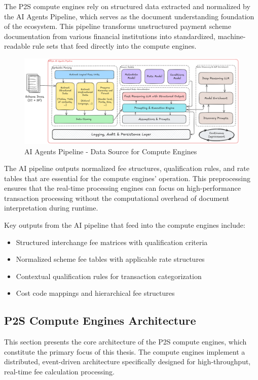 The P2S compute engines rely on structured data extracted and normalized by the AI Agents Pipeline, which serves as the document understanding foundation of the ecosystem. This pipeline transforms unstructured payment scheme documentation from various financial institutions into standardized, machine-readable rule sets that feed directly into the compute engines.

\begin{figure}[H]
    \centering
    \includegraphics[width=\textwidth]{img/arch/pipeline_design.png}
    \caption{AI Agents Pipeline - Data Source for Compute Engines}
    \label{fig:ai_pipeline_architecture}
\end{figure}

The AI pipeline outputs normalized fee structures, qualification rules, and rate tables that are essential for the compute engines' operation. This preprocessing ensures that the real-time processing engines can focus on high-performance transaction processing without the computational overhead of document interpretation during runtime.

Key outputs from the AI pipeline that feed into the compute engines include:
\begin{itemize}
    \item Structured interchange fee matrices with qualification criteria
    \item Normalized scheme fee tables with applicable rate structures  
    \item Contextual qualification rules for transaction categorization
    \item Cost code mappings and hierarchical fee structures
\end{itemize}

\subsection{P2S Compute Engines Architecture}

This section presents the core architecture of the P2S compute engines, which constitute the primary focus of this thesis. The compute engines implement a distributed, event-driven architecture specifically designed for high-throughput, real-time fee calculation processing.

